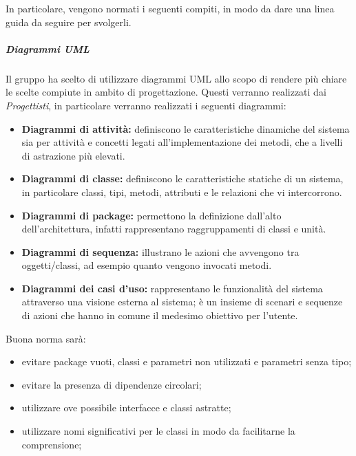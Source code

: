 In particolare, vengono normati i seguenti compiti, in modo da dare una linea guida da seguire per svolgerli.


\subparagraph{Diagrammi UML}

Il gruppo ha scelto di utilizzare diagrammi UML allo scopo di rendere più chiare le scelte compiute in ambito di
progettazione. Questi verranno realizzati dai \emph{Progettisti}, in particolare verranno realizzati i seguenti diagrammi:
\begin{itemize}
	\item \textbf{Diagrammi di attività:} definiscono le caratteristiche dinamiche del sistema sia per attività e concetti legati all’implementazione dei metodi, che a livelli di astrazione più elevati.  
	\item \textbf{Diagrammi di classe:} definiscono le caratteristiche statiche di un sistema, in particolare classi, tipi, metodi, attributi e le relazioni che vi intercorrono.
	\item \textbf{Diagrammi di package:} permettono la definizione dall'alto dell'architettura, infatti rappresentano raggruppamenti di classi e unità.
	\item \textbf{Diagrammi di sequenza:} illustrano le azioni che avvengono tra oggetti/classi, ad esempio quanto vengono invocati metodi.
	\item \textbf{Diagrammi dei casi d'uso:} rappresentano le funzionalità del sistema attraverso una visione esterna al sistema; è un insieme di scenari e sequenze di azioni che hanno in comune il medesimo obiettivo per l'utente. 
\end{itemize}
Buona norma sarà:
\begin{itemize}
	\item evitare package vuoti, classi e parametri non utilizzati e parametri senza tipo;
	\item evitare la presenza di dipendenze circolari;
	\item utilizzare ove possibile interfacce e classi astratte;
	\item utilizzare nomi significativi per le classi in modo da facilitarne la comprensione;
\end{itemize}

